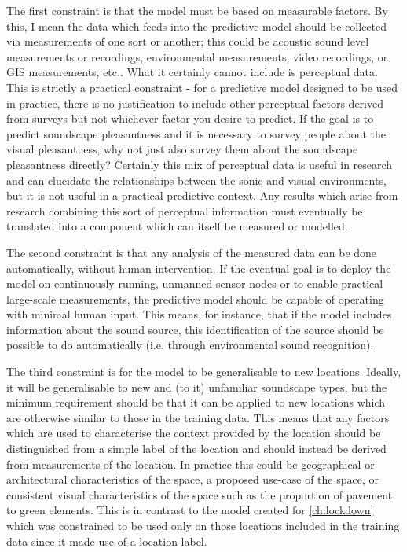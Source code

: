 The first constraint is that the model must be based on measurable factors. By this, I mean the data which feeds into the predictive model should be collected via measurements of one sort or another; this could be acoustic sound level measurements or recordings, environmental measurements, video recordings, or GIS measurements, etc.. What it certainly cannot include is perceptual data. This is strictly a practical constraint - for a predictive model designed to be used in practice, there is no justification to include other perceptual factors derived from surveys but not whichever factor you desire to predict. If the goal is to predict soundscape pleasantness and it is necessary to survey people about the visual pleasantness, why not just also survey them about the soundscape pleasantness directly? Certainly this mix of perceptual data is useful in research and can elucidate the relationships between the sonic and visual environments, but it is not useful in a practical predictive context. Any results which arise from research combining this sort of perceptual information must eventually be translated into a component which can itself be measured or modelled.

The second constraint is that any analysis of the measured data can be done automatically, without human intervention. If the eventual goal is to deploy the model on continuously-running, unmanned sensor nodes or to enable practical large-scale measurements, the predictive model should be capable of operating with minimal human input. This means, for instance, that if the model includes information about the sound source, this identification of the source should be possible to do automatically (i.e. through environmental sound recognition). 

The third constraint is for the model to be generalisable to new locations. Ideally, it will be generalisable to new and (to it) unfamiliar soundscape types, but the minimum requirement should be that it can be applied to new locations which are otherwise similar to those in the training data. This means that any factors which are used to characterise the context provided by the location should be distinguished from a simple label of the location and should instead be derived from measurements of the location. In practice this could be geographical or architectural characteristics of the space, a proposed use-case of the space, or consistent visual characteristics of the space such as the proportion of pavement to green elements. This is in contrast to the model created for \cref{ch:lockdown} which was constrained to be used only on those locations included in the training data since it made use of a location label.

